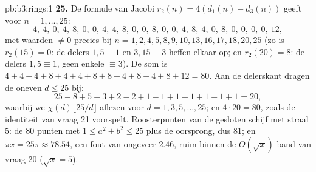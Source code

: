 \begin{solution}{pb:b3:rings:1}
\textbf{25.} De formule van Jacobi $r_2(n) = 4(d_1(n) - d_3(n))$
geeft voor $n = 1, \dots, 25$:
\[
4,\ 4,\ 0,\ 4,\ 8,\ 0,\ 0,\ 4,\ 4,\ 8,\ 0,\ 0,\ 8,\ 0,\ 0,\
4,\ 8,\ 4,\ 0,\ 8,\ 0,\ 0,\ 0,\ 0,\ 12,
\]
met waarden $\neq 0$ precies bij $n = 1, 2, 4, 5, 8, 9, 10, 13,
16, 17, 18, 20, 25$ (zo is $r_2(15) = 0$: de delers $1, 5 \equiv 1$
en $3, 15 \equiv 3$ heffen elkaar op; en $r_2(20) = 8$: de delers
$1, 5 \equiv 1$, geen enkele $\equiv 3$). De som is $4 + 4 + 4 + 8
+ 4 + 4 + 8 + 8 + 4 + 8 + 4 + 8 + 12 = 80$. Aan de delerskant
dragen de oneven $d \leq 25$ bij:
\[
25 - 8 + 5 - 3 + 2 - 2 + 1 - 1 + 1 - 1 + 1 - 1 + 1 = 20,
\]
waarbij we $\chi(d)\lfloor 25/d\rfloor$ aflezen voor $d = 1, 3, 5,
\dots, 25$; en $4 \cdot 20 = 80$, zoals de identiteit van vraag 21
voorspelt. Roosterpunten van de gesloten schijf met straal $5$: de
$80$ punten met $1 \leq a^2 + b^2 \leq 25$ plus de oorsprong, dus
$81$; en $\pi x = 25\pi \approx 78.54$, een fout van ongeveer
$2.46$, ruim binnen de $O(\sqrt x)$-band van vraag 20 ($\sqrt x =
5$).
\end{solution}
